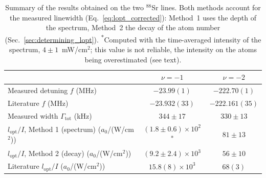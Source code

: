 \begin{table}[H]
\centering
\small
\begin{tabular}{@{}lcc@{}}
\toprule
 & $\nu=-1$ & $\nu=-2$ \\
\midrule
Measured detuning $f$ (MHz) & $-23.99(1)$ & $-222.70(1)$ \\
Literature $f$ (MHz) \cite{zelevinsky_narrow_2006} & $-23.932(33)$ & $-222.161(35)$ \\
Measured width $\Gamma_{\text{tot}}$ (kHz) & $344\pm17$ & $330\pm13$ \\
\addlinespace
$l_{\text{opt}}/I$, Method 1 (spectrum) ($a_0$/(W/cm$^2$)) & $(1.8\pm0.6)\times10^2$\textsuperscript{*} & $81\pm13$ \\
$l_{\text{opt}}/I$, Method 2 (decay) ($a_0$/(W/cm$^2$)) & $(9.2\pm2.4)\times10^3$ & $56\pm10$ \\
Literature $l_{\text{opt}}/I$ ($a_0$/(W/cm$^2$)) \cite{blatt_systematic_2011} & $15.8(8)\times10^3$ & $68(3)$ \\
\bottomrule
\end{tabular}
\caption{Summary of the results obtained on the two $^{88}$Sr lines. Both methods account for
the measured linewidth (Eq.~\ref{eq:lopt_corrected}): Method~1 uses the depth of the spectrum,
Method~2 the decay of the atom number (Sec.~\ref{sec:determining_lopt}).
\textsuperscript{*}Computed with the time-averaged intensity of the spectrum, $4\pm1$~mW/cm$^2$; this
value is not reliable, the intensity on the atoms being overestimated (see text).}
\label{tab:88Sr_results}
\end{table}

